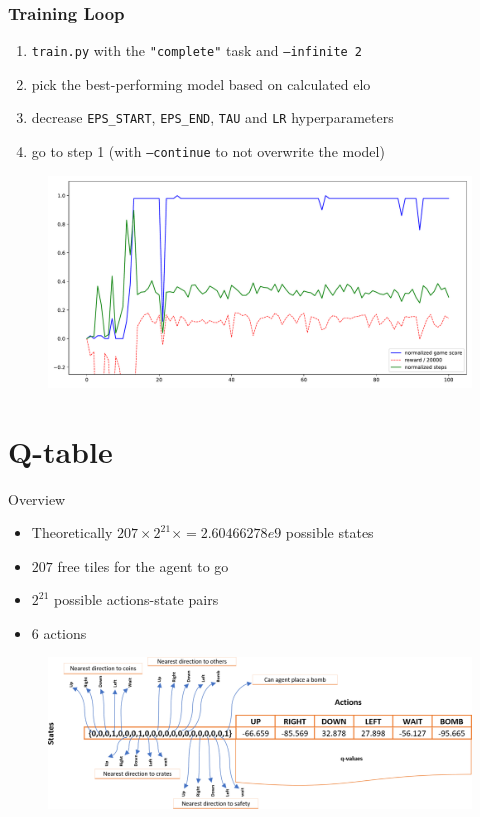 \documentclass{beamer}
\begin{document}
\begin{frame}[fragile]
	\frametitle{Training Loop}
	\pause

	\begin{enumerate}
			\item \texttt{train.py} with the \texttt{"complete"} task and \texttt{--infinite 2}
			\item pick the best-performing model based on calculated elo
			\item decrease \texttt{EPS\_START}, \texttt{EPS\_END}, \texttt{TAU} and \texttt{LR} hyperparameters
			\item go to step 1 (with \texttt{--continue} to not overwrite the model)
	\end{enumerate}

	\pause
	\begin{figure}[t]
			\centering
			\includegraphics[width=.8\linewidth]{coins.pdf}
	\end{figure}
\end{frame}

\section{Q-table}

\begin{frame}{Overview}
	\pause
	\begin{itemize}
		\item Theoretically $207 \times 2^21 \times = 2.60466278e9$ possible states
		\item $207$ free tiles for the agent to go
		\item $2 ^21$ possible actions-state pairs
		\item $6$ actions
	\end{itemize}

	\begin{figure}[t]
			\centering
			\includegraphics[width=.8\linewidth]{Q-table.png}
	\end{figure}
\end{frame}
\end{document}
